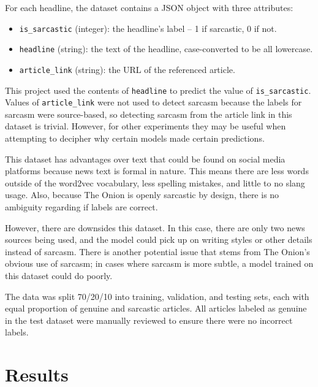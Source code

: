 \documentclass[11pt]{article}
\begin{document}
For each headline, the dataset contains a JSON object with three attributes:
\begin{itemize}
    \item \texttt{is\_sarcastic} (integer): the headline's label -- 1 if
          sarcastic, 0 if not.
    \item \texttt{headline} (string): the text of the headline, case-converted
          to be all lowercase.
    \item \texttt{article\_link} (string): the URL of the referenced article.
\end{itemize}

This project used the contents of \texttt{headline} to predict
the value of \texttt{is\_sarcastic}.
Values of \texttt{article\_link} were not used to detect sarcasm
because the labels for sarcasm were source-based,
so detecting sarcasm from the article link in this dataset is trivial.
However, for other experiments they may be useful when attempting
to decipher why certain models made certain predictions.

This dataset has advantages over text that could be found on social media
platforms because news text is formal in nature.
This means there are less words outside of the word2vec vocabulary,
less spelling mistakes, and little to no slang usage.
Also, because The Onion is openly sarcastic by design,
there is no ambiguity regarding if labels are correct.

However, there are downsides this dataset.
In this case, there are only two news sources being used,
and the model could pick up on writing styles or other details instead of sarcasm.
There is another potential issue that stems from The Onion's obvious use of sarcasm;
in cases where sarcasm is more subtle,
a model trained on this dataset could do poorly.

The data was split 70/20/10 into training, validation, and testing sets, each with equal
proportion of genuine and sarcastic articles. All articles labeled as genuine in the test
dataset were manually reviewed to ensure there were no incorrect labels.


\section{Results}\label{sec:res}
\end{document}
